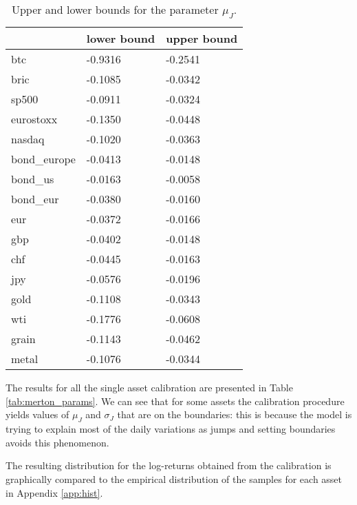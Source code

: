 \begin{table}
	\small
	\centering
	\caption[Upper and lower bounds for jump mean in Merton]{Upper and lower bounds for the parameter $\mu_J$.}
\begin{tabular}{lll}
	& lower bound & upper bound \\
		\midrule
	btc & -0.9316 & -0.2541 \\
	bric & -0.1085 & -0.0342 \\
	sp500 & -0.0911 & -0.0324 \\
	eurostoxx & -0.1350 & -0.0448 \\
	nasdaq & -0.1020 & -0.0363 \\
	bond\_europe & -0.0413 & -0.0148 \\
	bond\_us & -0.0163 & -0.0058 \\
	bond\_eur & -0.0380 & -0.0160 \\
	eur & -0.0372 & -0.0166 \\
	gbp & -0.0402 & -0.0148 \\
	chf & -0.0445 & -0.0163 \\
	jpy & -0.0576 & -0.0196 \\
	gold & -0.1108 & -0.0343 \\
	wti & -0.1776 & -0.0608 \\
	grain & -0.1143 & -0.0462 \\
	metal & -0.1076 & -0.0344 \\
	\midrule
	
\end{tabular}

\label{tab:mu_J_bounds}
\end{table}



The results for all the single asset calibration are presented in Table \ref{tab:merton_params}. We can see that for some assets the calibration procedure yields values of $\mu_J$ and $ \sigma_{J}$ that are on the boundaries: this is because the model is trying to explain most of the daily variations as jumps and setting boundaries avoids this phenomenon.

The resulting distribution for the log-returns obtained from the calibration is graphically  compared to the empirical distribution of the samples for each asset in Appendix \ref{app:hist}.
\bigskip


